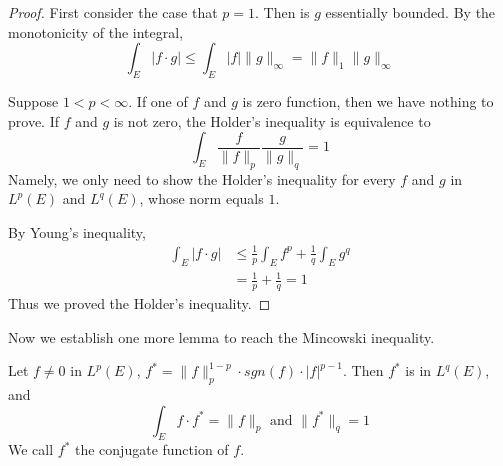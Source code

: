 \documentclass[lang=en, 12pt]{elegantbook}
\begin{document}
        \begin{proof}
            First consider the case that $p=1$. Then is $g$ essentially
        bounded. By the monotonicity of the integral,
        $$\int_E |f \cdot g| \leq \int_E |f|\lVert g \rVert_{\infty}
        = \lVert f \rVert_1 \lVert g \rVert_{\infty}$$\par
            Suppose $1<p<\infty$. If one of $f$ and $g$ is zero function,
        then we have nothing to prove. If $f$ and $g$ is not zero,
        the Holder's inequality is equivalence to 
        $$\int_E \frac{f}{\lVert f \rVert_p } \frac{g}{\lVert g \rVert_q } = 1$$
        Namely, we only need to show the Holder's inequality for 
        every $f$ and $g$ in $L^p(E)$ and $L^q(E)$, whose norm equals 
        $1$.\par
            By Young's inequality, 
            \begin{equation*}
                \begin{aligned}
                \int_E |f \cdot g| &\leq \frac{1}{p} \int_E f^p  
                + \frac{1}{q} \int_E g^q\\
                &= \frac{1}{p} +\frac{1}{q} =1
                \end{aligned}
            \end{equation*}
            Thus we proved the Holder's inequality.
        \end{proof}
        Now we establish one more lemma to reach the Mincowski 
    inequality. 
        \begin{lemma}
            Let $f \neq 0$ in $L^p(E)$, $f^* = \lVert f \rVert_p^{1-p} \cdot sgn(f) \cdot |f|^{p-1}$.
        Then $f^*$ is in $L^q(E)$, and 
        \begin{equation}\label{fStarMincowski}
            \int_E f \cdot f^* = \lVert f \rVert_p \mbox{ and } \lVert f^* \rVert_q =1
        \end{equation}
        We call $f^*$ the conjugate function of $f$.
        \end{lemma}
\end{document}
